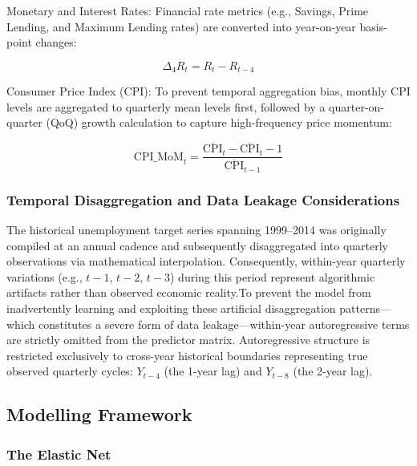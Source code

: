 \documentclass[
  letterpaper,
  DIV=11,
  numbers=noendperiod]{scrartcl}
\begin{document}
Monetary and Interest Rates: Financial rate metrics (e.g., Savings,
Prime Lending, and Maximum Lending rates) are converted into
year-on-year basis-point changes:

\[\Delta_4 R_t = R_t - R_{t-4}\]

Consumer Price Index (CPI): To prevent temporal aggregation bias,
monthly CPI levels are aggregated to quarterly mean levels first,
followed by a quarter-on-quarter (QoQ) growth calculation to capture
high-frequency price momentum:

\[\text{CPI\_MoM}_t = \frac{\overline{\text{CPI}}_t - \overline{\text{CPI}}_t-1}{\overline{\text{CPI}}_{t-1}}\]

\subsubsection{Temporal Disaggregation and Data Leakage
Considerations}\label{temporal-disaggregation-and-data-leakage-considerations}

The historical unemployment target series spanning 1999--2014 was
originally compiled at an annual cadence and subsequently disaggregated
into quarterly observations via mathematical interpolation.
Consequently, within-year quarterly variations (e.g., \(t-1\), \(t-2\),
\(t-3\)) during this period represent algorithmic artifacts rather than
observed economic reality.To prevent the model from inadvertently
learning and exploiting these artificial disaggregation patterns---which
constitutes a severe form of data leakage---within-year autoregressive
terms are strictly omitted from the predictor matrix. Autoregressive
structure is restricted exclusively to cross-year historical boundaries
representing true observed quarterly cycles: \(Y_{t-4}\) (the 1-year
lag) and \(Y_{t-8}\) (the 2-year lag).

\subsection{Modelling Framework}\label{modelling-framework}

\subsubsection{The Elastic Net}\label{the-elastic-net}
\end{document}
